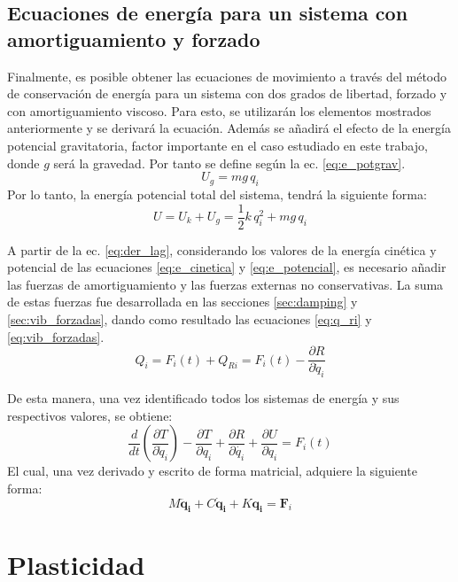 \subsection{Ecuaciones de energía para un sistema con amortiguamiento y forzado}
Finalmente, es posible obtener las ecuaciones de movimiento a través del método de conservación de energía para un sistema con dos grados de libertad, forzado y con amortiguamiento viscoso. Para esto, se utilizarán los elementos mostrados anteriormente y se derivará la ecuación. Además se añadirá el efecto de la energía potencial gravitatoria, factor importante en el caso estudiado en este trabajo, donde $g$ será la gravedad. Por tanto se define según la ec. \ref{eq:e_potgrav}. 
\begin{equation}\label{eq:e_potgrav}
	U_g = mg\,q_i
\end{equation}
Por lo tanto, la energía potencial total del sistema, tendrá la siguiente forma:
\begin{equation}\label{eq:e_potencial}
	U = U_k + U_g = \frac{1}{2}k\,q_i^2 + mg\,q_i
\end{equation}

A partir de la ec. \ref{eq:der_lag}, considerando los valores de la energía cinética y potencial de las ecuaciones \ref{eq:e_cinetica} y \ref{eq:e_potencial}, es necesario añadir las fuerzas de amortiguamiento y las fuerzas externas no conservativas. La suma de estas fuerzas fue desarrollada en las secciones \ref{sec:damping} y \ref{sec:vib_forzadas}, dando como resultado las ecuaciones \ref{eq:q_ri} y \ref{eq:vib_forzadas}.
\begin{equation}\label{eq:lag_modelo}
	Q_i = F_i(t) + Q_{Ri} = F_i(t) - \frac{\partial R}{\partial \dot{q}_i} 
\end{equation}

De esta manera, una vez identificado todos los sistemas de energía y sus respectivos valores, se obtiene:
\begin{equation}
	\frac{d}{dt}\left(\frac{\partial T}{\partial \dot{q}_i}\right) - \frac{\partial T}{\partial q_i} + \frac{\partial R}{\partial \dot{q_i}} + \frac{\partial U}{\partial q_i} = F_i(t)
\end{equation}
El cual, una vez derivado y escrito de forma matricial, adquiere la siguiente forma:
\begin{equation}
	\mathit{M}\mathbf{\ddot{q}_i} + \mathit{C}\mathbf{\dot{q}_i} + \mathit{K}\mathbf{q_i} = \mathbf{F}_i
\end{equation}

\section{Plasticidad}

